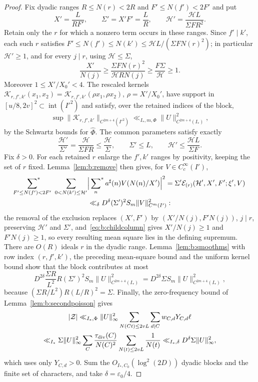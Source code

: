 \begin{proof}
Fix dyadic ranges $R\le N(r)<2R$ and $F'\le N(f')<2F'$ and put
\[
  X'=\frac L{RF'},\qquad\Sigma'=X'F'=\frac LR,\qquad\mathcal H'=\frac{\mathcal HL}{\Sigma FR^2}.
\]
Retain only the $r$ for which a nonzero term occurs in these ranges. Since $f'\mid k'$, each such $r$ satisfies $F'\le N(f')\le N(k')\le\mathcal HL/(\Sigma FN(r)^2)$; in particular $\mathcal H'\ge1$, and for every $j\mid r$, using $\mathcal H\le\Sigma$,
\begin{equation}\label{eq:b:childcolumn}
  \frac{X'}{N(j)}\ge\frac{\Sigma FN(r)^2}{\mathcal HRN(j)}\ge\frac{F\Sigma}{\mathcal H}\ge1.
\end{equation}
Moreover $1\le X'/X_0'<4$. The rescaled kernels $\mathcal K_{r,f',k'}(x_1,x_2)=\mathscr K_{r,f',k'}(\rho x_1,\rho x_2)$, $\rho=X'/X_0'$, have support in $[u/8,2v]^2\subset\operatorname{int}(I'^2)$ and satisfy, over the retained indices of the block,
\[
  \sup\|\mathcal K_{r,f',k'}\|_{C^{2m+4}(I'^2)}\ll_{I_*,m,\Phi}\|U\|^2_{C^{2m+4}(I_*)},
\]
by the Schwartz bounds for $\widehat\Phi$. The common parameters satisfy exactly
\[
  \frac{\mathcal H'}{\Sigma'}=\frac{\mathcal H}{\Sigma FR}\le\frac{\mathcal H}\Sigma,\qquad\Sigma'\le L,\qquad\mathcal H'\le\frac{\mathcal HL}{\Sigma F}.
\]
Fix $\delta>0$. For each retained $r$ enlarge the $f',k'$ ranges by positivity, keeping the set of $r$ fixed. Lemma~\ref{lem:b:remove} then gives, for $V\in C_c^\infty(I')$,
\begin{multline*}
  \sideset{}{^*}\sum_{F'\le N(f')<2F'}\ \sum_{0<N(k')\le\mathcal H'}\Bigl|\sideset{}{^*}\sum_na^\sharp(n)V(N(n)/X')\Bigr|^2=\Sigma'\mathcal{E}_{(r)}(\mathcal H',X',F';\xi',V)\\
  \ll_\delta D^\delta(\Sigma')^2S_m\|V\|^2_{C^m(I')}:
\end{multline*}
the removal of the exclusion replaces $(X',F')$ by $(X'/N(j),F'N(j))$, $j\mid r$, preserving $\mathcal H'$ and $\Sigma'$, and~\eqref{eq:b:childcolumn} gives $X'/N(j)\ge1$ and $F'N(j)\ge1$, so every resulting mean square lies in the defining supremum. There are $O(R)$ ideals $r$ in the dyadic range. Lemma~\ref{lem:b:smoothms} with row index $(r,f',k')$, the preceding mean-square bound and the uniform kernel bound show that the block contributes at most
\[
  D^{2\delta}\frac{\Sigma R}{L^2}R(\Sigma')^2S_m\|U\|^2_{C^{2m+4}(I_*)}=D^{2\delta}\Sigma S_m\|U\|^2_{C^{2m+4}(I_*)},
\]
because $(\Sigma R/L^2)R(L/R)^2=\Sigma$. Finally, the zero-frequency bound of Lemma~\ref{lem:b:secondpoisson} gives
\begin{multline*}
  |\mathcal Z|\ll_{I_*,\Phi}\|U\|_\infty^2\sum_{N(Ct)\le2vL}\sum_{d\mid C}w_{C,d}Y_{C,d}\ell\\
  \ll_{I_*}\Sigma\|U\|_\infty^2\sum_C\frac{\tau_{\rm div}(C)}{N(C)^2}\sum_{N(t)\le2vL}\frac1{N(t)}\ll_{I_*,\delta}D^\delta\Sigma\|U\|_\infty^2,
\end{multline*}
which uses only $Y_{C,d}>0$. Sum the $O_{I_*,C_0}(\log^2(2D))$ dyadic blocks and the finite set of characters, and take $\delta=\varepsilon_0/4$.
\end{proof}

